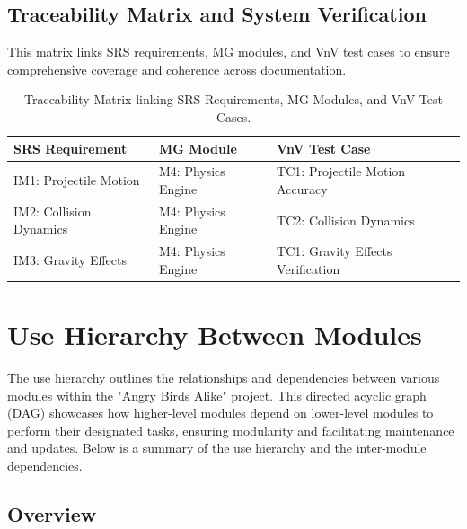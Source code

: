 \documentclass[12pt]{article}
\begin{document}
\subsection{Traceability Matrix and System Verification}
This matrix links SRS requirements, MG modules, and VnV test cases to ensure comprehensive coverage and coherence across documentation.

\begin{table}[H]
\centering
\begin{tabular}{|l|l|l|}
\hline
\textbf{SRS Requirement} & \textbf{MG Module} & \textbf{VnV Test Case} \\
\hline
IM1: Projectile Motion & M4: Physics Engine & TC1: Projectile Motion Accuracy \\
IM2: Collision Dynamics & M4: Physics Engine & TC2: Collision Dynamics \\
IM3: Gravity Effects & M4: Physics Engine & TC1: Gravity Effects Verification \\
\hline
\end{tabular}
\caption{Traceability Matrix linking SRS Requirements, MG Modules, and VnV Test Cases.}
\end{table}


\section{Use Hierarchy Between Modules}

The use hierarchy outlines the relationships and dependencies between various modules within the "Angry Birds Alike" project. This directed acyclic graph (DAG) showcases how higher-level modules depend on lower-level modules to perform their designated tasks, ensuring modularity and facilitating maintenance and updates. Below is a summary of the use hierarchy and the inter-module dependencies.

\subsection{Overview}
\end{document}
